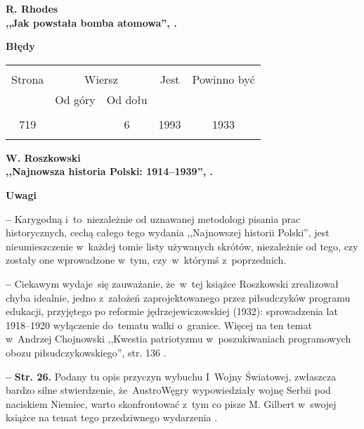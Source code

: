 \documentclass[a4paper,11pt]{article}
\newcommand{\spaceOne}{2em}
\newcommand{\tb}{\textbf}
\newcommand{\noi}{\noindent}
\newcommand{\start}{\noi \tb{--} {}}
\newcommand{\Center}[1]{\begin{center} #1 \end{center}}
\newcommand{\CenterTB}[1]{\Center{\tb{#1}}}
\newcommand{\Str}[1]{\tb{Str. #1.}}
\newcommand{\Work}[1]{ \begin{center} {\large \tb{#1}} \end{center} }
\begin{document}
\vspace{\spaceOne}



\Work{
  R. Rhodes \\
  ,,Jak powstała bomba atomowa'', \cite{Rho00}.}


\CenterTB{Błędy}
\begin{center}
  \begin{tabular}{|c|c|c|c|c|}
    \hline
    & \multicolumn{2}{c|}{} & & \\
    Strona & \multicolumn{2}{c|}{Wiersz}& Jest & Powinno być \\ \cline{2-3}
    & Od góry & Od dołu &  &  \\ \hline
    & & & & \\
    719 & & 6 & 1993 & 1933 \\
    & & & & \\ \hline
  \end{tabular}
\end{center}

\vspace{\spaceOne}



\Work{
  W. Roszkowski \\
  ,,Najnowsza historia Polski: 1914--1939'', \cite{Ros11a}.}


\CenterTB{Uwagi}

\start Karygodną i~to~niezależnie od uznawanej metodologi pisania prac
historycznych, cechą całego tego wydania ,,Najnowszej historii
Polski'', jest nieumieszczenie w~każdej tomie listy używanych skrótów,
niezależnie od tego, czy zostały one wprowadzone w~tym, czy~w~którymś
z~poprzednich.

\start Ciekawym wydaje~się zauważanie, że~w~tej książce Roszkowski
zrealizował chyba idealnie, jedno z~założeń zaprojektowanego przez
piłsudczyków programu edukacji, przyjętego po reformie
jędrzejewiczowskiej (1932): sprowadzenia lat 1918--1920 wyłączenie
do~tematu walki o~granice. Więcej na ten temat \\
w~Andrzej Chojnowski ,,Kwestia patriotyzmu w~poszukiwaniach
programowych obozu piłsudczykowskiego'', str. 136 \cite{PP06}.

\start \Str{26} Podany tu opis przyczyn wybuchu I~Wojny Światowej,
zwłaszcza bardzo silne stwierdzenie, że~Austro\dywiz Węgry
wypowiedziały wojnę Serbii pod naciskiem Niemiec, warto skonfrontować
z~tym co pisze M. Gilbert w~swojej książce na temat tego przedziwnego
wydarzenia \cite{Gil03}.
\end{document}
